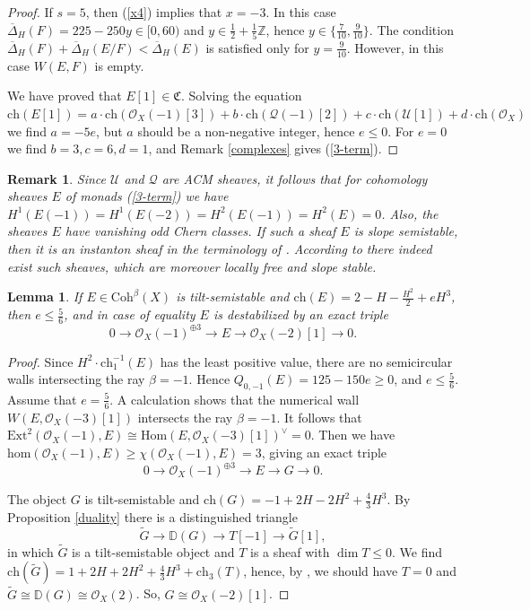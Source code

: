 \documentclass{amsart}
\newtheorem{lemma}[theorem]{Lemma}
\newtheorem{remark}[theorem]{Remark}
\begin{document}
\begin{proof}
		If $s=5$, then (\ref{x4}) implies that $x=-3$. In this case $\overline{\Delta}_H(F)=225-250y\in[0,60)$ and $y\in\frac 12+\frac 15\mathbb Z$, hence $y\in\{\frac{7}{10},\frac{9}{10}\}$. The condition $\overline{\Delta}_H(F)+\overline{\Delta}_H(E/F)<\overline{\Delta}_H(E)$ is satisfied only for $y=\frac{9}{10}$. However, in this case $W(E,F)$ is empty.
		
		We have proved that $E[1]\in\mathfrak C$. Solving the equation $\mathrm{ch}(E[1])=a\cdot\mathrm{ch}(\mathcal O_X(-1)[3])+b\cdot\mathrm{ch}(\mathcal Q(-1)[2])+c\cdot\mathrm{ch}(\mathcal U[1])+d\cdot\mathrm{ch}(\mathcal O_X)$ we find $a=-5e$, but $a$ should be a non-negative integer, hence $e\le 0$. For $e=0$ we find $b=3,c=6,d=1$, and Remark \ref{complexes} gives (\ref{3-term}).
	\end{proof}
	
	\begin{remark}\label{instantons}Since $\mathcal U$ and $\mathcal Q$ are ACM sheaves, it follows that for cohomology sheaves $E$ of monads (\ref{3-term}) we have $H^1(E(-1))=H^1(E(-2))=H^2(E(-1))=H^2(E)=0$. Also, the sheaves $E$ have vanishing odd Chern classes. If such a sheaf $E$ is slope semistable, then it is an instanton sheaf in the terminology of \cite{Higher rank}. According to \cite[Main Theorem 1]{Higher rank} there indeed exist such sheaves, which are moreover locally free and slope stable.
	\end{remark}
	
	\begin{lemma}\label{2 -1 -1/2} If $E\in\mathrm{Coh}^\beta(X)$ is tilt-semistable and $\mathrm{ch}(E)=2-H-\frac{H^2}{2}+eH^3$, then $e\le\frac 56$, and in case of equality $E$ is destabilized by an exact triple
		\begin{equation}\label{sequence2}0\to \mathcal O_X(-1)^{\oplus 3}\to E\to\mathcal O_X(-2)[1]\to 0.\end{equation}
	\end{lemma}
	\begin{proof} Since $H^2\cdot\mathrm{ch}_1^{-1}(E)$ has the least positive value, there are no semicircular walls intersecting the ray $\beta=-1$. Hence $Q_{0,-1}(E)=125-150e\ge 0$, and $e\le\frac 56$. Assume that $e=\frac 56$. A calculation shows that the numerical wall $W(E,\mathcal O_X(-3)[1])$ intersects the ray $\beta=-1$. It follows that $\mathrm{Ext}^2(\mathcal O_X(-1),E)\cong\mathrm{Hom}(E,\mathcal O_X(-3)[1])^\vee=0$. Then we have $\mathrm{hom}(\mathcal O_X(-1),E)\ge\chi(\mathcal O_X(-1),E)=3$, giving an exact triple
		$$0\to \mathcal O_X(-1)^{\oplus 3}\to E\to G\to 0.$$
		
		The object $G$ is tilt-semistable and $\mathrm{ch}(G)=-1+2H-2H^2+\frac 43H^3$. By Proposition \ref{duality} there is a distinguished triangle
		$$\widetilde{G}\to \mathbb D(G)\to T[-1]\to \widetilde{G}[1],$$
		in which $\widetilde{G}$ is a tilt-semistable object and $T$ is a sheaf with $\dim T\le 0$. We find $\mathrm{ch}(\widetilde{G})=1+2H+2H^2+\frac 43H^3+\mathrm{ch}_3(T)$, hence, by \cite[Proposition 3.1]{Vass}, we should have $T=0$ and $\widetilde{G}\cong\mathbb D(G)\cong\mathcal O_X(2)$. So, $G\cong\mathcal O_X(-2)[1]$.
	\end{proof}
	
\end{document}
